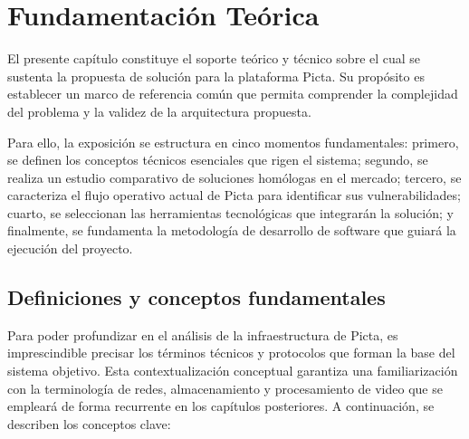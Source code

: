 \chapter{Fundamentación Teórica}

El presente capítulo constituye el soporte teórico y técnico sobre el cual se sustenta la propuesta 
de solución para la plataforma Picta. Su propósito es establecer un marco de referencia común que 
permita comprender la complejidad del problema y la validez de la arquitectura propuesta. 

Para ello, la exposición se estructura en cinco momentos fundamentales: primero, se definen los 
conceptos técnicos esenciales que rigen el sistema; segundo, se realiza un estudio comparativo de 
soluciones homólogas en el mercado; tercero, se caracteriza el flujo operativo actual de Picta para 
identificar sus vulnerabilidades; cuarto, se seleccionan las herramientas tecnológicas que integrarán 
la solución; y finalmente, se fundamenta la metodología de desarrollo de software que guiará la 
ejecución del proyecto.

\section{Definiciones y conceptos fundamentales}

Para poder profundizar en el análisis de la infraestructura de Picta, es imprescindible precisar los 
términos técnicos y protocolos que forman la base del sistema objetivo. Esta 
contextualización conceptual garantiza una familiarización con la terminología de 
redes, almacenamiento y procesamiento de video que se empleará de forma recurrente en los capítulos 
posteriores. A continuación, se describen los conceptos clave:

